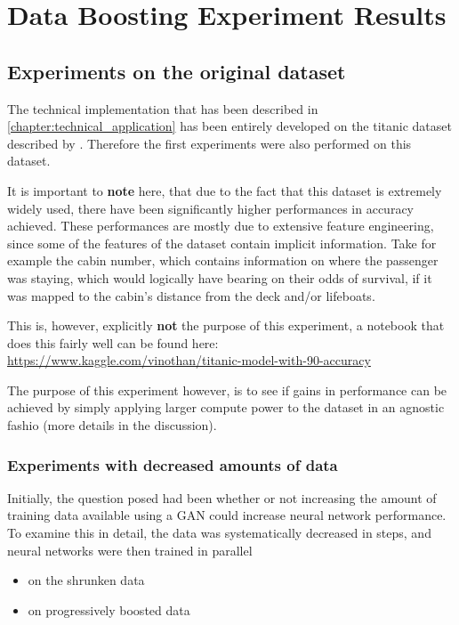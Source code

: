 \chapter{Data Boosting Experiment Results}
\label{chapter:experiment_results}

\section{Experiments on the original dataset}

The technical implementation that has been described in \ref{chapter:technical_application} has been entirely developed on the titanic dataset described by \cite{titanic}. 
Therefore the first experiments were also performed on this dataset.

It is important to \textbf{note} here, that due to the fact that this dataset is extremely widely used, there have been significantly higher performances in accuracy achieved.
These performances are mostly due to extensive feature engineering, since some of the features of the dataset contain implicit information. 
Take for example the cabin number, which contains information on where the passenger was staying, which would logically have bearing on their odds of survival, if it was mapped to the cabin's
distance from the deck and/or lifeboats.

This is, however, explicitly \textbf{not} the purpose of this experiment, a notebook that does this fairly well can be found here: \url{https://www.kaggle.com/vinothan/titanic-model-with-90-accuracy} 

The purpose of this experiment however, is to see if gains in performance can be achieved by simply applying larger compute power to the dataset in an agnostic fashio (more details in the discussion).

\subsection{Experiments with decreased amounts of data}

Initially, the question posed had been whether or not increasing the amount of training data available using a \ac{GAN} could increase neural network performance.
To examine this in detail, the data was systematically decreased in steps, and neural networks were then trained in parallel 

\begin{itemize}
	\item on the shrunken data 
	\item on progressively boosted data
\end{itemize}

